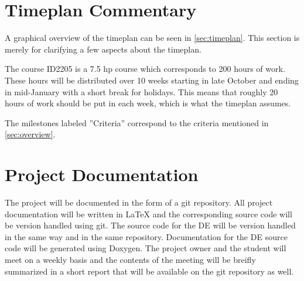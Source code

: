 \documentclass[12pt,twoside]{article}
\begin{document}
\section{Timeplan Commentary}
\label{sec:commentary}
A graphical overview of the timeplan can be seen in \ref{sec:timeplan}. This section is merely for clarifying a few aspects
about the timeplan.

The course ID2205 is a 7.5 hp course which corresponds to 200 hours of work. These hours will be distributed
over 10 weeks starting in late October and ending in mid-January with a short break for holidays. This means
that roughly 20 hours of work should be put in each week, which is what the timeplan assumes.

The milestones labeled ''Criteria'' correspond to the criteria mentioned in \ref{sec:overview}.




\section{Project Documentation}
\label{documentation}

The project will be documented in the form of a git repository. All project documentation will be written
in LaTeX and the corresponding source code will be version handled using git. The source code for the DE will
be version handled in the same way and in the same repository. Documentation for the DE source code
will be generated using Doxygen. The project owner and the student will meet on a weekly basis and the
contents of the meeting will be breifly summarized in a short report that will be available on the git repository as well. 


\clearpage




\clearpage

\appendix
\end{document}
